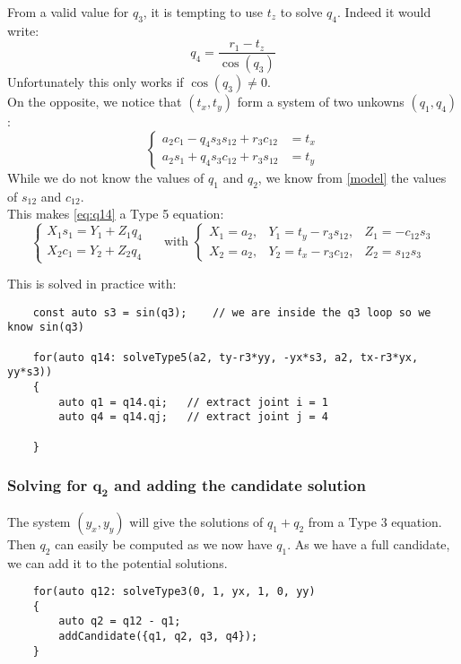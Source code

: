 \documentclass{ecnreport}
\begin{document}
    From a valid value for $q_3$, it is tempting to use $t_z$ to solve $q_4$. Indeed it would write:
    \begin{equation*}
    q_4 = \frac{r_1 - t_z}{\cos(q_3)}
    \end{equation*}Unfortunately this only works if $\cos(q_3) \neq 0$.\\
    On the opposite, we notice that $(t_x, t_y)$ form a system of two unkowns $(q_1, q_4)$:
    \begin{equation}
    \left\{\begin{array}{ll}
            a_{2} c_1 - q_{4} s_3 s_{12} + r_{3} c_{12} &= t_x \\  a_{2} s_1 + q_{4} s_3 c_{12} + r_{3} s_{12} &= t_y
            \end{array}\right.\label{eq:q14}
    \end{equation}While we do not know the values of $q_1$ and $q_2$, we know from \eqref{model} the values of $s_{12}$ and $c_{12}$.\\
    This makes \eqref{eq:q14} a Type 5 equation:
    \begin{equation*}
    \left\{\begin{array}{l}X_1s_1 = Y_1+Z_1q_4 \\ X_2c_1 = Y_2+Z_2q_4\end{array}\right. \quad \text{ with } 
    \left\{\begin{array}{ccc}
        X_1 = a_2, & Y_1 = t_y-r_3s_{12}, & Z_1 =-c_{12}s_3 \\X_2 = a_2, & Y_2 = t_x-r_3c_{12}, & Z_2 = s_{12}s_3
        \end{array}\right.
    \end{equation*}
    
    This is solved in practice with:
    \begin{center}
    \cppstyle \raggedright
    \begin{lstlisting}
    const auto s3 = sin(q3);    // we are inside the q3 loop so we know sin(q3)
    
    for(auto q14: solveType5(a2, ty-r3*yy, -yx*s3, a2, tx-r3*yx, yy*s3))
    {
        auto q1 = q14.qi;   // extract joint i = 1
        auto q4 = q14.qj;   // extract joint j = 4
    
    }
    \end{lstlisting}
\end{center}


\subsubsection*{Solving for $\mathbf{q_2}$ and adding the candidate solution}

The system $(y_x, y_y)$ will give the solutions of $q_1+q_2$ from a Type 3 equation. Then $q_2$ can easily be computed as we now have $q_1$. As we have a full candidate, we can add it to the potential solutions.

    \begin{center}
    \cppstyle \raggedright
    \begin{lstlisting}
    for(auto q12: solveType3(0, 1, yx, 1, 0, yy)
    {
        auto q2 = q12 - q1;
        addCandidate({q1, q2, q3, q4});
    }
    \end{lstlisting}
\end{center}
\end{document}
